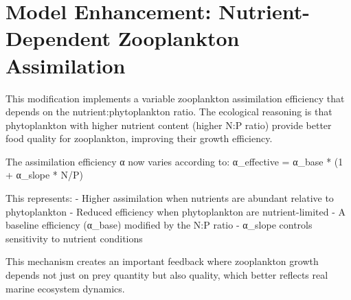 \section{Model Enhancement: Nutrient-Dependent Zooplankton Assimilation}

This modification implements a variable zooplankton assimilation efficiency that depends on the nutrient:phytoplankton ratio. The ecological reasoning is that phytoplankton with higher nutrient content (higher N:P ratio) provide better food quality for zooplankton, improving their growth efficiency.

The assimilation efficiency α now varies according to:
α_effective = α_base * (1 + α_slope * N/P)

This represents:
- Higher assimilation when nutrients are abundant relative to phytoplankton
- Reduced efficiency when phytoplankton are nutrient-limited
- A baseline efficiency (α_base) modified by the N:P ratio
- α_slope controls sensitivity to nutrient conditions

This mechanism creates an important feedback where zooplankton growth depends not just on prey quantity but also quality, which better reflects real marine ecosystem dynamics.
